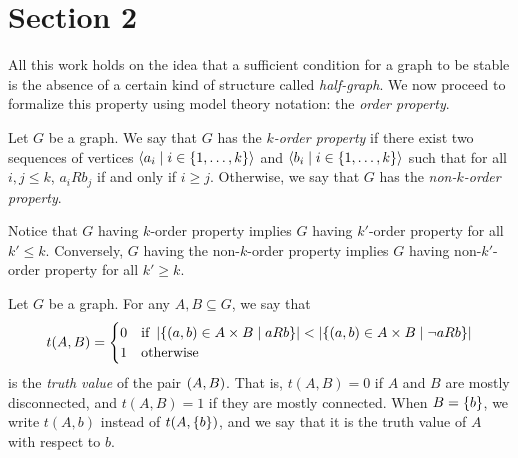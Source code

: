 \section{Section 2} \label{sec:section_2}

    All this work holds on the idea that a sufficient condition for a graph to be stable is the absence of
    a certain kind of structure called \emph{half-graph}.
    We now proceed to formalize this property using model theory notation: the \emph{order property}.

    \begin{definition} \label{def:k_order_property}
        Let $G$ be a graph.
        We say that $G$ has the \emph{$k$-order property} if there exist two sequences of vertices
        $\left< a_i \mid i \in \left\{ 1, \dots, k \right\} \right>$ and $\left< b_i \mid i \in \left\{ 1, \dots, k \right\} \right>$ such that
        for all $i,j \leq k$, $a_i R b_j$ if and only if $i \geq j$.
        Otherwise, we say that $G$ has the \emph{non-$k$-order property}.
    \end{definition}


    \begin{remark}
        Notice that $G$ having $k$-order property implies $G$ having $k'$-order property for all $k' \leq k$.
        Conversely, $G$ having the non-$k$-order property implies $G$ having non-$k'$-order property for all $k' \geq k$.
    \end{remark}

    \begin{definition} \label{def:truth_value}
        Let $G$ be a graph.
        For any $A, B \subseteq G$, we say that
        \[
            t(A,B) =
            \begin{cases}
                0 & \text{if } \left| \left\{ \left( a, b \right) \in A \times B \mid a R b \right\} \right| <
                    \left| \left\{ \left( a, b \right) \in A \times B \mid \neg a R b \right\} \right| \\
                1 & \text{otherwise}
            \end{cases}
        \]
        is the \emph{truth value} of the pair $\left( A,B \right)$.
        That is, $t(A,B) = 0$ if $A$ and $B$ are mostly disconnected, and $t(A,B) = 1$ if they are mostly connected.
        When $B = \left\{ b \right\}$, we write $t(A,b)$ instead of $t(A,\left\{ b \right\})$, and we say that it is the truth value of $A$
        with respect to $b$.
    \end{definition}

